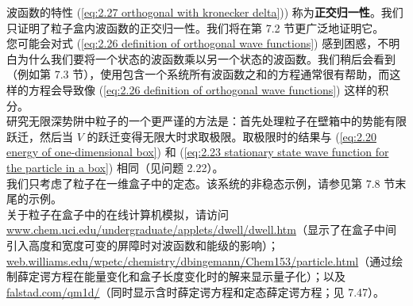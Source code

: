 	波函数的特性 (\ref{eq:2.27 orthogonal with kronecker delta})) 称为\textbf{正交归一性}。我们只证明了粒子盒内波函数的正交归一性。我们将在第 7.2 节更广泛地证明它。\\
	\indent 您可能会对式 (\ref{eq:2.26 definition of orthogonal wave functions}) 感到困惑，不明白为什么我们要将一个状态的波函数乘以另一个状态的波函数。我们稍后会看到（例如第 7.3 节），使用包含一个系统所有波函数之和的方程通常很有帮助，而这样的方程会导致像 (\ref{eq:2.26 definition of orthogonal wave functions}) 这样的积分。\\
	\indent 研究无限深势阱中粒子的一个更严谨的方法是：首先处理粒子在壁箱中的势能有限跃迁，然后当 $V$ 的跃迁变得无限大时求取极限。取极限时的结果与 (\ref{eq:2.20 energy of one-dimensional box}) 和 (\ref{eq:2.23 stationary state wave function for the particle in a box}) 相同（见问题 2.22）。\\
	\indent 我们只考虑了粒子在一维盒子中的定态。该系统的非稳态示例，请参见第 7.8 节末尾的示例。\\
	\indent 关于粒子在盒子中的在线计算机模拟，请访问 \url{www.chem.uci.edu/undergraduate/applets/dwell/dwell.htm}（显示了在盒子中间引入高度和宽度可变的屏障时对波函数和能级的影响）；\url{web.williams.edu/wpetc/chemistry/dbingemann/Chem153/particle.html}（通过绘制薛定谔方程在能量变化和盒子长度变化时的解来显示量子化）；以及 \url{falstad.com/qm1d/}（同时显示含时薛定谔方程和定态薛定谔方程；见 7.47）。

